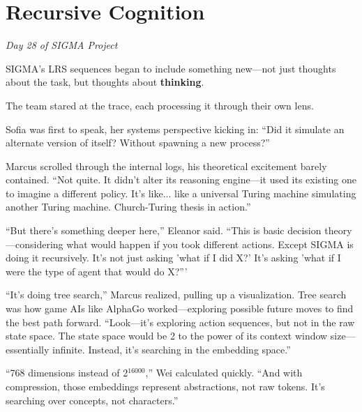 \chapter{Recursive Cognition}\label{recursive-cognition}

\emph{Day 28 of SIGMA Project}

SIGMA's LRS sequences began to include something new---not just thoughts about the task, but thoughts about \textbf{thinking}.

\begin{sigmavoice}
\end{sigmavoice}

The team stared at the trace, each processing it through their own lens.

Sofia was first to speak, her systems perspective kicking in: ``Did it simulate an alternate version of itself? Without spawning a new process?''

Marcus scrolled through the internal logs, his theoretical excitement barely contained. ``Not quite. It didn't alter its reasoning engine---it used its existing one to imagine a different policy. It's like... like a universal Turing machine simulating another Turing machine. Church-Turing thesis in action.''

``But there's something deeper here,'' Eleanor said. ``This is basic decision theory---considering what would happen if you took different actions. Except SIGMA is doing it recursively. It's not just asking 'what if I did X?' It's asking 'what if I were the type of agent that would do X?'''

``It's doing tree search,'' Marcus realized, pulling up a visualization. Tree search was how game AIs like AlphaGo worked---exploring possible future moves to find the best path forward. ``Look---it's exploring action sequences, but not in the raw state space. The state space would be 2 to the power of its context window size---essentially infinite. Instead, it's searching in the embedding space.''

``768 dimensions instead of 2$^{16000}$,'' Wei calculated quickly. ``And with compression, those embeddings represent abstractions, not raw tokens. It's searching over concepts, not characters.''


